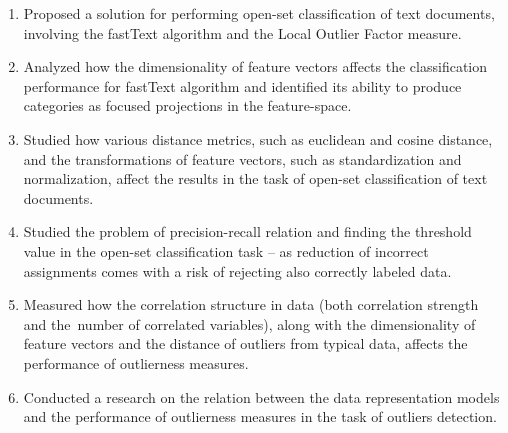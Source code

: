 \begin{enumerate}
    \item Proposed a solution for performing open-set classification of text documents, involving the fastText algorithm and the Local Outlier Factor measure. \cite{Walkowiak-2019-icaisc}

    \item Analyzed how the dimensionality of feature vectors affects the classification performance for fastText algorithm and identified its ability to produce categories as focused projections in the feature-space. \cite{Walkowiak-2019-depcos}

    \item Studied how various distance metrics, such as euclidean and cosine distance, and the transformations of feature vectors, such as standardization and normalization, affect the results in the task of open-set classification of text documents. \cite{Walkowiak-2019-ieaaie}

    \item Studied the problem of precision-recall relation and finding the threshold value in the open-set classification task – as reduction of incorrect assignments comes with a risk of rejecting also correctly labeled data. \cite{Walkowiak-2019-intellisys}

    \item Measured how the correlation structure in data (both correlation strength and the~number of correlated variables), along with the dimensionality of feature vectors and the distance of outliers from typical data, affects the performance of outlierness measures. \cite{Datko-2022}

    \item Conducted a research on the relation between the data representation models and the performance of outlierness measures in the task of outliers detection. \cite{Datko-2024}
\end{enumerate}

